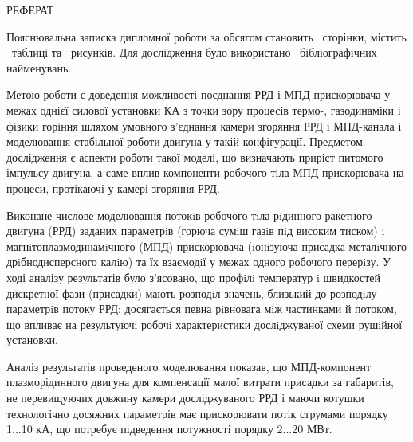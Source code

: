 \restoregeometry
\begin{center}
	{РЕФЕРАТ}
\end{center}

Пояснювальна записка дипломної роботи за обсягом становить   \pageref*{LastPage}~сторінки, містить \totaltables~таблиці та  \totalfigures~рисунків. Для дослідження було використано  ~бібліографічних найменувань.


Метою роботи є доведення можливості поєднання РРД і МПД-прискорювача у межах однієї силової установки КА з точки зору процесів термо-, газодинаміки і фізики горіння шляхом умовного з'єднання камери згоряння РРД і МПД-канала і моделювання стабільної роботи двигуна у такій конфігурації. Предметом дослідження є аспекти роботи такої моделі, що визначають приріст питомого імпульсу двигуна, а саме вплив компоненти робочого тіла МПД-прискорювача на процеси, протікаючі у камері згоряння РРД.

Виконане числове моделювання потокiв робочого тiла рiдинного ракетного двигуна (РРД) заданих параметрiв (горюча сумiш газiв пiд високим тиском) i магнiтоплазмодинамiчного (МПД) прискорювача (iонiзуюча присадка металiчного дрiбнодисперсного калiю) та їх взаємодiї у межах одного робочого перерiзу. У ході аналізу результатів було з’ясовано, що профiлi температур i швидкостей дискретної фази (присадки) мають розподiл значень, близький до розподiлу параметрiв потоку РРД; досягається певна рiвновага мiж частинками й потоком, що впливає на результуючi робочi характеристики дослiджуваної схеми рушiйної установки.

Аналіз результатів проведеного моделювання показав, що МПД-компонент плазморідинного двигуна для компенсації малої витрати присадки за габаритів, не перевищуючих довжину камери досліджуваного РРД і маючи котушки технологічно досяжних параметрів має прискорювати потік струмами порядку 1...10 кА, що потребує підведення потужності порядку 2...20 МВт.

